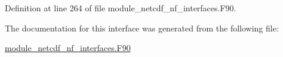 Definition at line 264 of file module\+\_\+netcdf\+\_\+nf\+\_\+interfaces.\+F90.



The documentation for this interface was generated from the following file\+:\begin{DoxyCompactItemize}
\item 
\hyperlink{module__netcdf__nf__interfaces_8F90}{module\+\_\+netcdf\+\_\+nf\+\_\+interfaces.\+F90}\end{DoxyCompactItemize}
